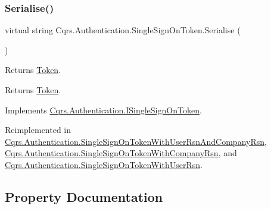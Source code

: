 \subsubsection{\texorpdfstring{Serialise()}{Serialise()}}
{\footnotesize\ttfamily virtual string Cqrs.\+Authentication.\+Single\+Sign\+On\+Token.\+Serialise (\begin{DoxyParamCaption}{ }\end{DoxyParamCaption})\hspace{0.3cm}{\ttfamily [virtual]}}



Returns \hyperlink{classCqrs_1_1Authentication_1_1SingleSignOnToken_a7a704dd5d4f396e5c0b413b4b39e7406_a7a704dd5d4f396e5c0b413b4b39e7406}{Token}. 

\begin{DoxyReturn}{Returns}
\hyperlink{classCqrs_1_1Authentication_1_1SingleSignOnToken_a7a704dd5d4f396e5c0b413b4b39e7406_a7a704dd5d4f396e5c0b413b4b39e7406}{Token}.
\end{DoxyReturn}


Implements \hyperlink{interfaceCqrs_1_1Authentication_1_1ISingleSignOnToken_af34e8c0b052865d687064d3381bfbcdb_af34e8c0b052865d687064d3381bfbcdb}{Cqrs.\+Authentication.\+I\+Single\+Sign\+On\+Token}.



Reimplemented in \hyperlink{classCqrs_1_1Authentication_1_1SingleSignOnTokenWithUserRsnAndCompanyRsn_a8d44249c00e5264dc7b37f4868836a80_a8d44249c00e5264dc7b37f4868836a80}{Cqrs.\+Authentication.\+Single\+Sign\+On\+Token\+With\+User\+Rsn\+And\+Company\+Rsn}, \hyperlink{classCqrs_1_1Authentication_1_1SingleSignOnTokenWithCompanyRsn_a0bc9f0fae90121d029fe0730708f4210_a0bc9f0fae90121d029fe0730708f4210}{Cqrs.\+Authentication.\+Single\+Sign\+On\+Token\+With\+Company\+Rsn}, and \hyperlink{classCqrs_1_1Authentication_1_1SingleSignOnTokenWithUserRsn_a8103820e6352c10b3990fb027dd9b5ae_a8103820e6352c10b3990fb027dd9b5ae}{Cqrs.\+Authentication.\+Single\+Sign\+On\+Token\+With\+User\+Rsn}.



\subsection{Property Documentation}
\mbox{\label{classCqrs_1_1Authentication_1_1SingleSignOnToken_aa0ea2d0654dd2aab23af98806663cd7c_aa0ea2d0654dd2aab23af98806663cd7c}} 
